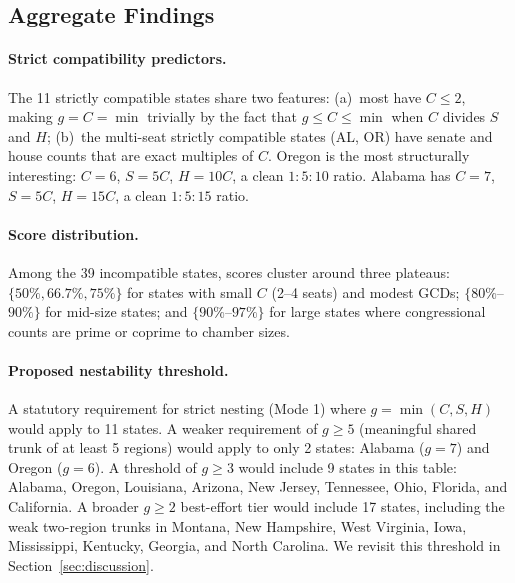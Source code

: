 \subsection{Aggregate Findings}

\paragraph{Strict compatibility predictors.}  The 11 strictly compatible
states share two features: (a)~most have $C \leq 2$, making $g = C = \min$
trivially by the fact that $g \leq C \leq \min$ when $C$ divides $S$ and $H$;
(b)~the multi-seat strictly compatible states (AL, OR) have senate and house
counts that are exact multiples of $C$.  Oregon is the most structurally
interesting: $C = 6$, $S = 5C$, $H = 10C$, a clean $1:5:10$ ratio.
Alabama has $C = 7$, $S = 5C$, $H = 15C$, a clean $1:5:15$ ratio.

\paragraph{Score distribution.}  Among the 39 incompatible states, scores
cluster around three plateaus: $\{50\%, 66.7\%, 75\%\}$ for states with
small $C$ (2--4 seats) and modest GCDs; $\{80\%$--$90\%\}$ for mid-size
states; and $\{90\%$--$97\%\}$ for large states where congressional counts
are prime or coprime to chamber sizes.

\paragraph{Proposed nestability threshold.}  A statutory requirement for strict
nesting (Mode 1) where $g = \min(C,S,H)$ would apply to 11 states.  A weaker
requirement of $g \geq 5$ (meaningful shared trunk of at least 5 regions)
would apply to only 2 states: Alabama ($g=7$) and Oregon ($g=6$).  A
threshold of $g \geq 3$ would include 9 states in this table: Alabama, Oregon,
Louisiana, Arizona, New Jersey, Tennessee, Ohio, Florida, and California.  A
broader $g \geq 2$ best-effort tier would include 17 states, including the
weak two-region trunks in Montana, New Hampshire, West Virginia, Iowa,
Mississippi, Kentucky, Georgia, and North Carolina.
We revisit this threshold in Section~\ref{sec:discussion}.
